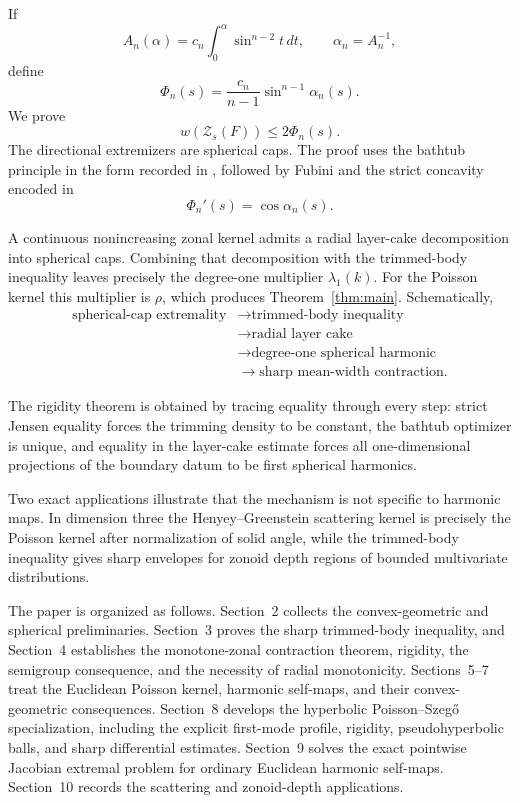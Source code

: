 \documentclass[11pt,reqno]{amsart}
\theoremstyle{remark}
\begin{document}
If
\[
 A_n(\alpha)
 =
 c_n\int_0^\alpha\sin^{n-2}t\,dt,
 \qquad
 \alpha_n=A_n^{-1},
\]
define
\[
 \Phi_n(s)
 =
 \frac{c_n}{n-1}\sin^{n-1}\alpha_n(s).
\]
We prove
\[
 w(\mathcal Z_s(F))
 \le
 2\Phi_n(s).
\]
The directional extremizers are spherical caps.  The proof uses the
bathtub principle in the form recorded in \cite{LiebLoss}, followed by
Fubini and the strict concavity encoded in
\[
 \Phi_n'(s)=\cos\alpha_n(s).
\]

A continuous nonincreasing zonal kernel admits a radial layer-cake
decomposition into spherical caps.  Combining that decomposition with the
trimmed-body inequality leaves precisely the degree-one multiplier
$\lambda_1(k)$.  For the Poisson kernel this multiplier is $\rho$, which
produces Theorem~\ref{thm:main}.  Schematically,
\begin{align*}
 \text{spherical-cap extremality}
 &\longrightarrow
 \text{trimmed-body inequality}\\
 &\longrightarrow
 \text{radial layer cake}\\
 &\longrightarrow
 \text{degree-one spherical harmonic}\\
 &\longrightarrow
 \text{sharp mean-width contraction}.
\end{align*}

The rigidity theorem is obtained by tracing equality through every step:
strict Jensen equality forces the trimming density to be constant, the
bathtub optimizer is unique, and equality in the layer-cake estimate
forces all one-dimensional projections of the boundary datum to be first
spherical harmonics.

Two exact applications illustrate that the mechanism is not specific to
harmonic maps.  In dimension three the Henyey--Greenstein scattering
kernel is precisely the Poisson kernel after normalization of solid angle,
while the trimmed-body inequality gives sharp envelopes for zonoid depth
regions of bounded multivariate distributions.

The paper is organized as follows.  Section~2 collects the convex-geometric and spherical preliminaries.  Section~3 proves the sharp trimmed-body inequality, and Section~4 establishes the monotone-zonal contraction theorem, rigidity, the semigroup consequence, and the necessity of radial monotonicity.  Sections~5--7 treat the Euclidean Poisson kernel, harmonic self-maps, and their convex-geometric consequences.  Section~8 develops the hyperbolic Poisson--Szeg\H{o} specialization, including the explicit first-mode profile, rigidity, pseudohyperbolic balls, and sharp differential estimates.  Section~9 solves the exact pointwise Jacobian extremal problem for ordinary Euclidean harmonic self-maps.  Section~10 records the scattering and zonoid-depth applications.
\end{document}
